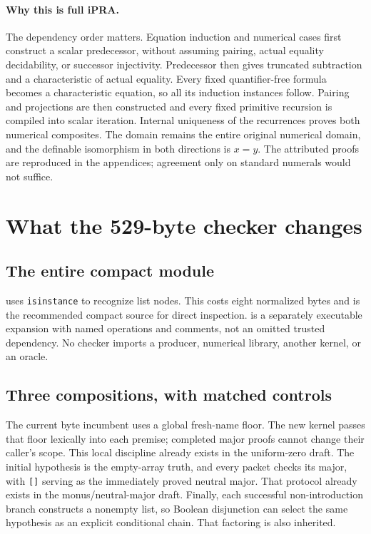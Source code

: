 \paragraph{Why this is full iPRA.}
The dependency order matters. Equation induction and numerical cases first
construct a scalar predecessor, without assuming pairing, actual equality
decidability, or successor injectivity. Predecessor then gives truncated
subtraction and a characteristic of actual equality. Every fixed
quantifier-free formula becomes a characteristic equation, so all its
induction instances follow. Pairing and projections are then constructed
and every fixed primitive recursion is compiled into scalar iteration.
Internal uniqueness of the recurrences proves both numerical composites.
The domain remains the entire original numerical domain, and the definable
isomorphism in both directions is $x=y$. The attributed proofs are reproduced
in the appendices; agreement only on standard numerals would not suffice.

\section{What the 529-byte checker changes}
\label{sec:composition}

\subsection{The entire compact module}



 uses \texttt{isinstance} to recognize list
nodes. This costs eight normalized bytes and is the recommended compact
source for direct inspection.
 is a separately executable expansion with
named operations and comments, not an omitted trusted dependency. No checker
imports a producer, numerical library, another kernel, or an oracle.

\subsection{Three compositions, with matched controls}

The current byte incumbent uses a global fresh-name floor. The new kernel
passes that floor lexically into each premise; completed major proofs cannot
change their caller's scope. This local discipline already exists in the
uniform-zero draft. The initial hypothesis is the empty-array truth, and
every packet checks its major, with \texttt{[]} serving as the immediately
proved neutral major. That protocol already exists in the monus/neutral-major
draft. Finally, each successful non-introduction branch constructs a nonempty
list, so Boolean disjunction can select the same hypothesis as an explicit
conditional chain. That factoring is also inherited.

